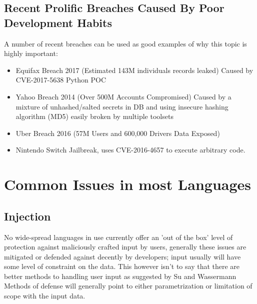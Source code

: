 \documentclass{IEEEtran}
\begin{document}
        \subsection{Recent Prolific Breaches Caused By Poor Development Habits}
            A number of recent breaches can be used as good examples of why this topic is highly 
            important:
            \begin{itemize}
                \item Equifax Breach 2017 (Estimated 143M individuals records leaked)\cite{Equifax-FTC}
                Caused by CVE-2017-5638\cite{CVE-2017-5638} Python POC\cite{POC-CVE-2017-5638}
                \item Yahoo Breach 2014 (Over 500M Accounts Compromised)\cite{Yahoo-Breach} Caused 
                by a mixture of unhashed/salted secrets in DB and using insecure hashing algorithm 
                (MD5) easily broken by multiple toolsets\cite{John-The-Ripper}
                \item Uber Breach 2016 (57M Users and 600,000 Drivers Data Exposed)\cite{Uber-Breach}
                \item Nintendo Switch Jailbreak, uses CVE-2016-4657\cite{CVE-2016-4657} to 
                execute arbitrary code.
                
            \end{itemize}

    \section{Common Issues in most Languages}
        \subsection{Injection}
            \label{sec:injection}
            No wide-spread languages in use currently offer an 'out of the box' level of 
            protection against maliciously crafted input by users, generally these issues are 
            mitigated or defended against decently by developers; input usually will have some level
            of constraint on the data.
            This however isn't to say that there are better methods to handling user input as 
            suggested by Su and Wassermann\cite{su2006essence}
            \\
            Methods of defense will generally point to either parametrization or limitation of scope 
            with the input data.
\end{document}
